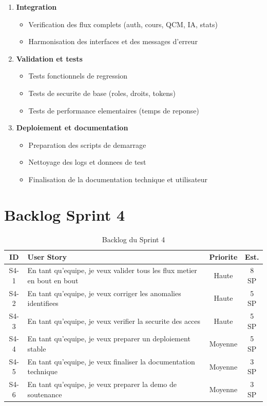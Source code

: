 \documentclass[a4paper,12pt]{report}
\begin{document}
\begin{enumerate}
  \item \textbf{Integration}
  \begin{itemize}
    \item Verification des flux complets (auth, cours, QCM, IA, stats)
    \item Harmonisation des interfaces et des messages d'erreur
  \end{itemize}
  \item \textbf{Validation et tests}
  \begin{itemize}
    \item Tests fonctionnels de regression
    \item Tests de securite de base (roles, droits, tokens)
    \item Tests de performance elementaires (temps de reponse)
  \end{itemize}
  \item \textbf{Deploiement et documentation}
  \begin{itemize}
    \item Preparation des scripts de demarrage
    \item Nettoyage des logs et donnees de test
    \item Finalisation de la documentation technique et utilisateur
  \end{itemize}
\end{enumerate}

\section{Backlog Sprint 4}

\begin{table}[H]
  \centering
  \caption{Backlog du Sprint 4}
  \label{tab:backlog_s4}
  \begin{tabular}{|c|p{7.5cm}|c|c|}
    \hline
    \textbf{ID} & \textbf{User Story} & \textbf{Priorite} & \textbf{Est.} \\
    \hline
    S4-1 & En tant qu'equipe, je veux valider tous les flux metier en bout en bout & Haute & 8 SP \\
    \hline
    S4-2 & En tant qu'equipe, je veux corriger les anomalies identifiees & Haute & 5 SP \\
    \hline
    S4-3 & En tant qu'equipe, je veux verifier la securite des acces & Haute & 5 SP \\
    \hline
    S4-4 & En tant qu'equipe, je veux preparer un deploiement stable & Moyenne & 5 SP \\
    \hline
    S4-5 & En tant qu'equipe, je veux finaliser la documentation technique & Moyenne & 3 SP \\
    \hline
    S4-6 & En tant qu'equipe, je veux preparer la demo de soutenance & Moyenne & 3 SP \\
    \hline
  \end{tabular}
\end{table}
\end{document}
